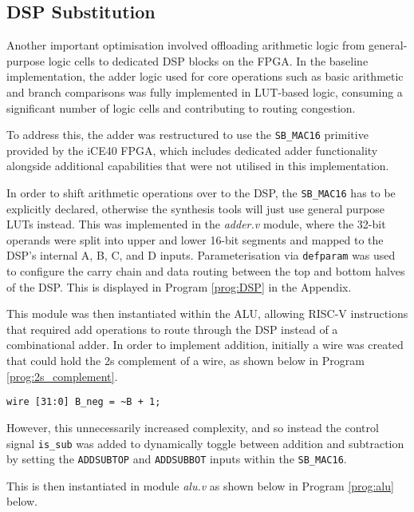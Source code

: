 \documentclass[a4paper,10pt]{article}
\begin{document}
\subsection{DSP Substitution}
\label{sec:DSP}

Another important optimisation involved offloading arithmetic logic 
from general-purpose logic cells to dedicated DSP blocks on the FPGA. 
In the baseline implementation, the adder logic used for core operations 
such as basic arithmetic and branch comparisons 
was fully implemented in LUT-based logic, 
consuming a significant number of logic cells and contributing to routing congestion. 

To address this, the adder was restructured to use the 
\texttt{SB\_MAC16} primitive provided by the iCE40 FPGA, 
which includes dedicated adder functionality alongside 
additional capabilities that were not utilised in this implementation.

In order to shift arithmetic operations over to the DSP,
the \texttt{SB\_MAC16} has to be explicitly declared,
otherwise the synthesis tools will just use general purpose LUTs instead.
This was implemented in the \textit{adder.v} module, 
where the 32-bit operands were split into upper and lower 16-bit segments 
and mapped to the DSP's internal A, B, C, and D inputs. 
Parameterisation via \texttt{defparam} was used to configure the carry chain 
and data routing between the top and bottom halves of the DSP.
This is displayed in Program \ref{prog:DSP} in the Appendix.

This module was then instantiated within the ALU, allowing RISC-V instructions 
that required add operations to route through the DSP instead 
of a combinational adder. 
In order to implement addition, initially a wire was created that could
hold the 2s complement of a wire, as shown below in Program \ref{prog:2s_complement}.

\begin{lstlisting}[style=verilog-style, caption=
    {2s compliment}, label={prog:2s_complement}]
wire [31:0] B_neg = ~B + 1;
\end{lstlisting}

However, this unnecessarily increased complexity, and so instead
the control signal \texttt{is\_sub} was added to dynamically toggle between 
addition and subtraction by setting the 
\texttt{ADDSUBTOP} and \texttt{ADDSUBBOT} inputs
within the \texttt{SB\_MAC16}. 

This is then instantiated in module \textit{alu.v}
as shown below in Program \ref{prog:alu} below.
\end{document}
